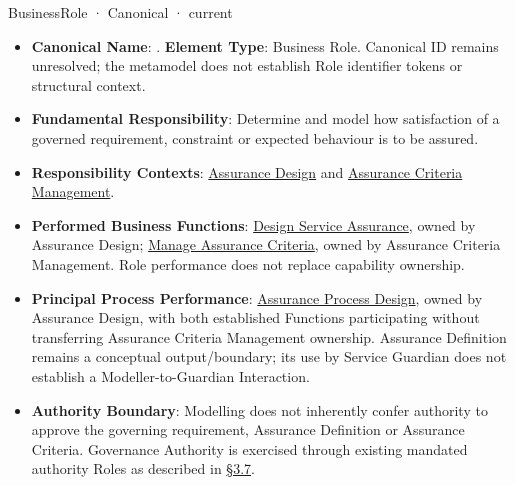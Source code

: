 \label{element:962735ea17a840e5a772f813d3ad7d45}
{\small BusinessRole · Canonical · current}\par

\begin{itemize}


\item \textbf{Canonical Name}: \texttt{}. \textbf{Element Type}: Business Role. Canonical ID remains unresolved; the metamodel does not establish Role identifier tokens or structural context.

\item \textbf{Fundamental Responsibility}: Determine and model how satisfaction of a governed requirement, constraint or expected behaviour is to be assured.

\item \textbf{Responsibility Contexts}: \href{\detokenize{../../../../../../../../docs/markdown/02-strategy/capabilities/business-enabling-capabilities.md#assurance-design}}{Assurance Design} and \href{\detokenize{../../../../../../../../docs/markdown/02-strategy/capabilities/business-enabling-capabilities.md#assurance-criteria-management}}{Assurance Criteria Management}.

\item \textbf{Performed Business Functions}: \href{\detokenize{../../../../../../../../docs/markdown/03-business-architecture/behaviours/health-service-assurance.md#design-service-assurance}}{Design Service Assurance}, owned by Assurance Design; \href{\detokenize{../../../../../../../../docs/markdown/03-business-architecture/behaviours/health-service-assurance.md#manage-assurance-criteria}}{Manage Assurance Criteria}, owned by Assurance Criteria Management. Role performance does not replace capability ownership.

\item \textbf{Principal Process Performance}: \href{\detokenize{../../../../../../../../docs/markdown/03-business-architecture/processes/business-processes.md#assurance-process-design}}{Assurance Process Design}, owned by Assurance Design, with both established Functions participating without transferring Assurance Criteria Management ownership. Assurance Definition remains a conceptual output/boundary; its use by Service Guardian does not establish a Modeller-to-Guardian Interaction.

\item \textbf{Authority Boundary}: Modelling does not inherently confer authority to approve the governing requirement, Assurance Definition or Assurance Criteria. Governance Authority is exercised through existing mandated authority Roles as described in \href{\detokenize{../../../../../../../../docs/markdown/03-business-architecture/actors-roles/roles.md#37-governance-authority-and-assurance-modelling}}{§3.7}.


\end{itemize}
